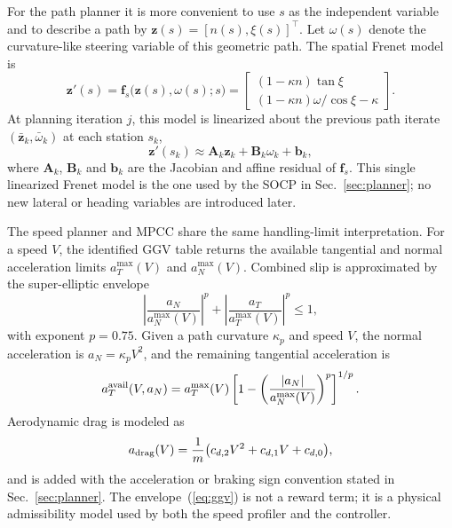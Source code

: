 \documentclass{iopjournal}
\begin{document}
For the path planner it is more convenient to use $s$ as the independent
variable and to describe a path by $\bm{z}(s)=[n(s),\xi(s)]^\top$.  Let
$\omega(s)$ denote the curvature-like steering variable of this geometric
path.  The spatial Frenet model is
\begin{equation}
\bm{z}'(s)=
\bm{f}_s\bigl(\bm{z}(s),\omega(s);s\bigr)
=
\begin{bmatrix}
(1-\kappa n)\tan\xi\\[2pt]
(1-\kappa n)\omega/\cos\xi-\kappa
\end{bmatrix}.
\label{eq:spatial_model}
\end{equation}
At planning iteration $j$, this model is linearized about the previous path
iterate $(\bar{\bm{z}}_k,\bar\omega_k)$ at each station $s_k$,
\begin{equation}
\bm{z}'(s_k)\approx
\bm{A}_k\bm{z}_k+\bm{B}_k\omega_k+\bm{b}_k,
\label{eq:linear_spatial_model}
\end{equation}
where $\bm{A}_k$, $\bm{B}_k$ and $\bm{b}_k$ are the Jacobian and affine
residual of $\bm{f}_s$.  This single linearized Frenet model is the one used
by the SOCP in Sec.~\ref{sec:planner}; no new lateral or heading variables are
introduced later.


The speed planner and MPCC share the same handling-limit interpretation.  For
a speed $V$, the identified GGV table returns the available tangential and
normal acceleration limits $a_T^{\max}(V)$ and $a_N^{\max}(V)$.  Combined slip
is approximated by the super-elliptic envelope
\begin{equation}
\left|\frac{a_N}{a_N^{\max}(V)}\right|^p+
\left|\frac{a_T}{a_T^{\max}(V)}\right|^p\le1,
\label{eq:ggv}
\end{equation}
with exponent $p=0.75$.  Given a path curvature $\kappa_p$ and speed $V$, the
normal acceleration is $a_N=\kappa_pV^2$, and the remaining tangential
acceleration is
\begin{equation}
a_T^{\rm avail}(V,a_N)=a_T^{\max}(V)
\left[1-\left(\frac{|a_N|}{a_N^{\max}(V)}\right)^p\right]^{1/p}.
\label{eq:ggv_tangent}
\end{equation}
Aerodynamic drag is modeled as
\begin{equation}
a_{\rm drag}(V)=\frac{1}{m}\bigl(c_{d,2}V^2+c_{d,1}V+c_{d,0}\bigr),
\label{eq:drag}
\end{equation}
and is added with the acceleration or braking sign convention stated in
Sec.~\ref{sec:planner}.  The envelope~(\ref{eq:ggv}) is not a reward term; it
is a physical admissibility model used by both the speed profiler and the
controller.
\end{document}
